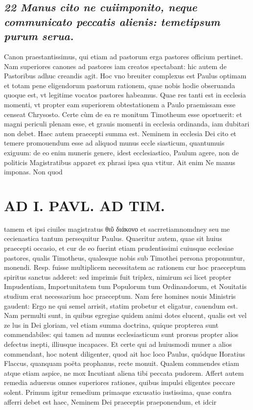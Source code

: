 \documentclass{article}
\begin{document}
\begin{pages}
\subsection*{\textit{22 Manus cito ne cuiimponito, neque communicato peccatis alienis: temetipsum purum serua. }}\pstart Canon praestantissimus, qui etiam ad pastorum erga pastores officium pertinet. Nam superiores canones ad pastores iam creatos spectabant: hic autem de Pastoribus adhuc creandis agit. Hoc vno breuiter complexus est Paulus optimam et totam pene eligendorum pastorum rationem, quae nobis hodie obseruanda quoque est, vt legitime vocatos pastores habeamus. Quae res tanti est in ecclesia momenti, vt propter eam superiorem obtestationem a Paulo praemissam esse censeat Chrysosto. Certe cùm de ea re monitum Timotheum esse oportuerit: et magni periculi plenam esse, et grauis momenti in ecclesia ordinanda, iam dubitari non debet. Haec autem praecepti summa est. Neminem in ecclesia Dei cito et temere promouendum esse ad aliquod munus eccle siasticum, quantumuis exiguum: de eo enim muneris genere, idest ecclesiastico, Paulum agere, non de politicis Magistratibus apparet ex phrasi ipsa qua vtitur. Ait enim Ne manus imponas. Non quod  \pend
\section*{AD I. PAVL. AD TIM. }
\marginpar{[ p.338 ]}\pstart tamem et ipsi ciuiles magistratus θιῦ διάκονο et sacrretiamnomdney seu me cecienastica tantum persequitur Paulus.  \pend\pstart Quaeritur autem, quae sit huius praecepti occasio, et cur de eo fuerint etiam prudentissimi cuiusque ecclesiae pastores, qualis Timotheus, qualesque nobis sub Timothei persona proponuntur, monendi. Resp. fuisse multiplicem necessitatem ac rationem cur hoc praeceptum spiritus sanctus adderet: sed imprimis fuit triplex, nimirum sci licet propter Impudentiam, Importunitatem tum Populorum tum Ordinandorum, et Nouitatis studium erat necessarium hoc praeceptum. Nam fere homines nouis Ministris gaudent: Ergo ne qui semel arrisit, statim probetur et eligatur, cauendum est. Nam permulti sunt, in quibus egregiae quidem animi dotes elucent, qualis est vel ze lus in Dei gloriam, vel etiam summa doctrina, quique propterea sunt commendabiles: qui tamen ad munus ecclesiasticum sunt prorsus propter alios defectus inepti, illiusque incapaces. Et certe qui ad huiusmodi muner a alios commendant, hoc notent diligenter, quod ait hoc loco Paulus, quódque Horatius Flaccus, quanquam poëta prophanus, recte monuit. Qualem commendes etiam atque etiam aspice, ne mox Incutiant aliena tibi peccata pudorem.  \pend\pstart Affert autem remedia aduersus omnes superiores rationes, quibus impulsi eligentes peccare solent. Primum igitur remedium primaque excusatio iustissima, quae contra afferri debet est haec, Neminem Dei praeceptis praeponendum, et idcir  \pend

\end{pages}
\end{document}
